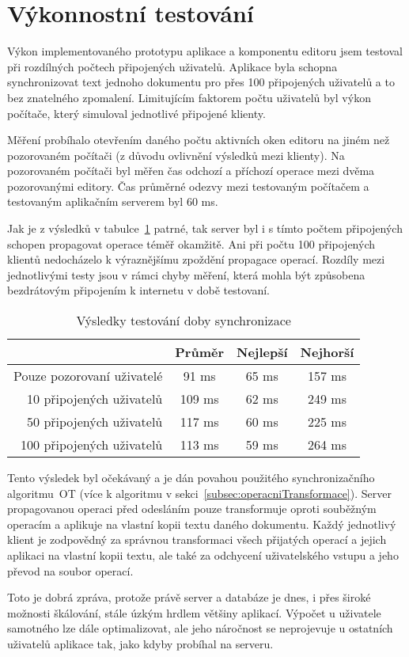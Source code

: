 
\section{Výkonnostní testování}\label{sec:systémovéTestování}

Výkon implementovaného prototypu aplikace a komponentu editoru jsem testoval při rozdílných počtech připojených uživatelů.
Aplikace byla schopna synchronizovat text jednoho dokumentu pro přes 100 připojených uživatelů a to bez znatelného zpomalení.
Limitujícím faktorem počtu uživatelů byl výkon počítače, který simuloval jednotlivé připojené klienty.

Měření probíhalo otevřením daného počtu aktivních oken editoru na jiném než pozorovaném počítači (z důvodu ovlivnění výsledků mezi klienty).
Na pozorovaném počítači byl měřen čas odchozí a příchozí operace mezi dvěma pozorovanými editory.
Čas průměrné odezvy mezi testovaným počítačem a testovaným aplikačním serverem byl 60 ms.

Jak je z výsledků v tabulce~\ref{tab:vysledkyVýkonostníhoTestování} patrné, tak server byl i s tímto počtem připojených schopen propagovat operace téměř okamžitě.
Ani při počtu 100 připojených klientů nedocházelo k výraznějšímu zpoždění propagace operací.
Rozdíly mezi jednotlivými testy jsou v rámci chyby měření, která mohla být způsobena bezdrátovým připojením k internetu v době testovaní.

\begin{table}[ht!]
    \centering
    \caption{Výsledky testování doby synchronizace}
    \label{tab:vysledkyVýkonostníhoTestování}
    \begin{tabular}{r|ccc}
        & Průměr & Nejlepší & Nejhorší \\ \hline
        Pouze pozorovaní uživatelé & 91 ms & 65 ms & 157 ms \\
        10 připojených uživatelů & 109 ms & 62 ms & 249 ms \\
        50 připojených uživatelů & 117 ms & 60 ms & 225 ms \\
        100 připojených uživatelů & 113 ms & 59 ms & 264 ms
    \end{tabular}
\end{table}

Tento výsledek byl očekávaný a je dán povahou použitého synchronizačního algoritmu~\gls{OT} (více k algoritmu v sekci~\ref{subsec:operacniTransformace}).
Server propagovanou operaci před odesláním pouze transformuje oproti souběžným operacím a aplikuje na vlastní kopii textu daného dokumentu.
Každý jednotlivý klient je zodpovědný za správnou transformaci všech přijatých operací a jejich aplikaci na vlastní kopii textu, ale také za odchycení uživatelského vstupu a jeho převod na soubor operací.

Toto je dobrá zpráva, protože právě server a databáze je dnes, i přes široké možnosti škálování, stále úzkým hrdlem většiny aplikací.
Výpočet u uživatele samotného lze dále optimalizovat, ale jeho náročnost se neprojevuje u ostatních uživatelů aplikace tak, jako kdyby probíhal na serveru.
